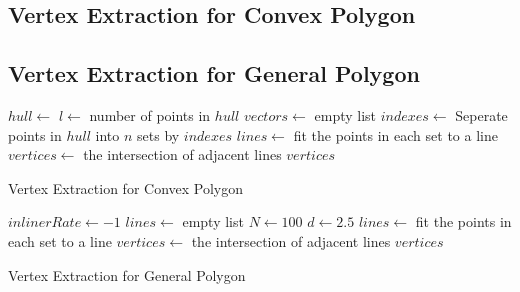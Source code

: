 \documentclass{article}
\begin{document}
\subsection{Vertex Extraction for Convex Polygon}
\label{sec:Vertex Extraction for Convex Polygon}



\subsection{Vertex Extraction for General Polygon}
\label{sec:Vertex Extraction for General Polygon}


\begin{algorithm}[h]  %
  \small              %
  \BlankLine
  $hull \leftarrow$   \;
  $l \leftarrow$  number of points in $hull$ \;
  $vectors \leftarrow $  empty list \;
  $indexes \leftarrow$  \;
  Seperate points in $hull$ into $n$ sets by $indexes$  \;
  $lines \leftarrow$ fit the points in each set to a line \;
  $vertices \leftarrow$ the intersection of adjacent lines \;
  \Return $vertices$
  \caption{Vertex Extraction for Convex Polygon}
  \label{algo_convex_polygon}
\end{algorithm}

\begin{algorithm}[h]
  \small
  \BlankLine
  $inlinerRate \leftarrow -1$ \;
  $lines \leftarrow$ empty list \;
  $N \leftarrow 100 $\; %
  $d \leftarrow 2.5 $\; %
   \;
  $lines \leftarrow$ fit the points in each set to a line \;
  $vertices \leftarrow$ the intersection of adjacent lines \;
  \Return $vertices$
  \caption{Vertex Extraction for General Polygon}\label{algo_nonconvex_polygon}
\end{algorithm}
\end{document}
